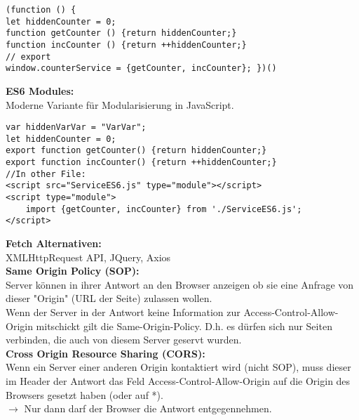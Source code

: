 \documentclass[7pt,landscape,a4paper]{scrartcl}
\begin{document}
\begin{multicols*}{4}
\begin{lstlisting}[style=htmlcssjs]
(function () {
let hiddenCounter = 0;
function getCounter () {return hiddenCounter;}
function incCounter () {return ++hiddenCounter;}
// export
window.counterService = {getCounter, incCounter}; })()
\end{lstlisting}
	\textcolor{b}{\textbf{ES6 Modules:}}\\
	Moderne Variante für Modularisierung in JavaScript.
\begin{lstlisting}[style=htmlcssjs]
var hiddenVarVar = "VarVar";
let hiddenCounter = 0;
export function getCounter() {return hiddenCounter;}
export function incCounter() {return ++hiddenCounter;}
//In other File:
<script src="ServiceES6.js" type="module"></script>
<script type="module">
	import {getCounter, incCounter} from './ServiceES6.js';
</script>
\end{lstlisting}
	\textcolor{b}{\textbf{Fetch Alternativen:}}\\
	XMLHttpRequest API, JQuery, Axios\\
	\textcolor{b}{\textbf{Same Origin Policy (SOP):}}\\
	Server können in ihrer Antwort an den Browser anzeigen ob sie eine Anfrage von dieser "Origin" (URL der Seite) zulassen wollen.\\
	Wenn der Server in der Antwort keine Information zur Access-Control-Allow-Origin mitschickt	gilt die Same-Origin-Policy.	D.h. es dürfen sich nur Seiten verbinden, die auch von diesem Server geservt wurden.\\
	\textcolor{b}{\textbf{Cross Origin Resource Sharing (CORS):}}\\
	Wenn ein Server einer anderen Origin kontaktiert wird (nicht SOP), muss dieser im Header der Antwort das Feld Access-Control-Allow-Origin auf die Origin des Browsers	gesetzt haben (oder auf *).\\
	$\rightarrow$ Nur dann darf der Browser die	Antwort entgegennehmen.

\end{multicols*}
\end{document}
